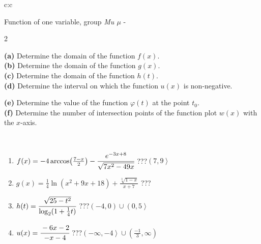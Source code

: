 \documentclass[10pt]{report}
\begin{document}
\begin{tabular}{c:c}
\begin{minipage}[c][104.5mm][t]{0.5\linewidth}
\begin{center}
\vspace{7mm}
{\huge Function of one variable, group \textit{Mu $\mu$} -}\\[5mm]
\begin{minipage}{0.95\linewidth}
\begin{center}
{\small \begin{multicols}{2} \raggedright
\textbf{(a)} Determine the domain of the function \(f(x)\). \\[1mm]
\textbf{(b)} Determine the domain of the function \(g(x)\). \\[1mm]
\textbf{(c)} Determine the domain of the function \(h(t)\). \\[1mm]
\textbf{(d)} Determine the interval on which the function \(u(x)\) is non-negative. \par \columnbreak
\textbf{(e)} Determine the value of the function \(\varphi(t)\) at the point \(t_0\). \\[1mm]
\textbf{(f)} Determine the number of intersection points of the function plot \(w(x)\) with the \(x\)-axis. \\[1mm]
\end{multicols}
}
\end{center}
\end{minipage}
\\[4mm]
\begin{minipage}{0.79\linewidth}
\begin{center}
\begin{varwidth}{\linewidth}
\begin{enumerate}
\small
\item $f(x) = -4\arccos\!\left( \frac{7-x}{2} \right) - \cfrac{e^{-3x+8}}{\sqrt{7x^2-49x}}$\quad \dotfill\; ???\;\dotfill \quad $\left(7 , 9\right\rangle$
\item $g(x) = \frac{1}{4} \ln{\!(x^2+9x+18)}+\frac{\sqrt[3]{1-x}}{x+7}$\quad \dotfill\; ???\;\dotfill {}
\item $h(t) = \cfrac{\sqrt{25-t^2}}{\log_2(1+\frac{1}{4}t)}$\quad \dotfill\; ???\;\dotfill \quad $\left(-4 , 0\right)\cup\left(0 , 5\right\rangle$
\item $u(x) = \cfrac{-6x-2}{-x-4}$\quad \dotfill\; ???\;\dotfill \quad $\left(-\infty , -4\right\rangle\cup\left(\frac{-1}{3} , \infty\right)$

\end{enumerate}
\end{varwidth}
\end{center}
\end{minipage}
\end{center}
\end{minipage}
\end{tabular}
\end{document}
